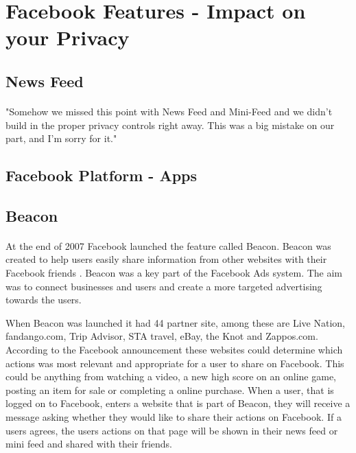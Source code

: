 \section{Facebook Features - Impact on your Privacy}\label{sec:facebook_features}


\subsection{News Feed}
\paragraph{}
"Somehow we missed this point with News Feed and Mini-Feed and we didn't build in the proper privacy controls right away. This was a big mistake on our part, and I'm sorry for it." \cite{FacebookStoryInceptionToIsp}

\subsection{Facebook Platform - Apps}


\subsection{Beacon}

\paragraph{}
At the end of 2007 Facebook launched the feature called Beacon. Beacon was created to help users easily share information from other websites with their Facebook friends \cite{BeaconWebsites}. Beacon was a key part of the Facebook Ads system. The aim was to connect businesses and users and create a more targeted advertising towards the users. 

When Beacon was launched it had 44 partner site, among these are Live Nation, fandango.com, Trip Advisor, STA travel, eBay, the Knot and Zappos.com. According to the Facebook announcement \cite{BeaconWebsites} these websites could determine which actions was most relevant and appropriate for a user to share on Facebook. This could be anything from watching a video, a new high score on an online game, posting an item for sale or completing a online purchase. When a user, that is logged on to Facebook, enters a website that is part of Beacon, they will receive a message asking whether they would like to share their actions on Facebook. If a users agrees, the users actions on that page will be shown in their news feed or mini feed and shared with their friends.  

